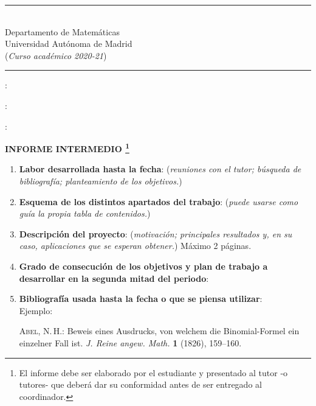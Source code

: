 \documentclass[a4paper,oneside,11pt,leqno]{article}
\begin{document}
\hrule
\vskip 6pt

 \\
Departamento de Matem\'aticas\\
Universidad Aut\'onoma de Madrid\\
\noindent ({\it Curso acad\'emico 2020-21})
\vskip 6pt \hrule

\vskip 5mm

:

\vskip 5mm

:

\vskip 5mm

:

\vskip 2cm


\centerline{\bf INFORME INTERMEDIO \footnote{ El informe debe ser elaborado por el estudiante y presentado al tutor -o tutores- que deber\'a dar su conformidad antes de ser entregado al coordinador.}}

\vskip 5mm

\begin{enumerate}

\item[1.-] {\bf Labor desarrollada hasta la fecha}: (\textit{reuniones con el tutor; b\'usqueda de bibliograf\'ia; planteamiento de los objetivos.})

\item[2.-] {\bf Esquema de los distintos apartados del trabajo}: (\textit{puede usarse como gu\'ia la propia tabla de contenidos.})

\item[3.-] {\bf Descripci\'on del proyecto}: (\textit{motivaci\'on; principales resultados y, en su caso, aplicaciones que se esperan obtener.}) M\'aximo 2 p\'aginas.

\item[4.-] {\bf Grado de consecuci\'on de los objetivos y plan de trabajo a desarrollar en la segunda mitad del periodo}:

\item[5.-] {\bf Bibliograf\'ia usada hasta la fecha o que se piensa utilizar}: \\
Ejemplo:

\begin{thebibliography}{10}

    \textsc{Abel, N.\,H.}:
    Beweis eines Ausdrucks, von welchem die Binomial-Formel ein einzelner Fall ist.
    \textit{J. Reine angew. Math.} {\bf1} (1826), 159--160.

\end{thebibliography}


\end{enumerate}
\end{document}
